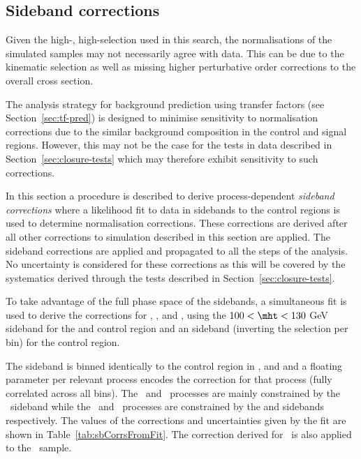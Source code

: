 \subsection{Sideband corrections}
\label{sec:sideband-corrections}

Given the high-\scalht, high-\etmiss selection used in this search, 
the normalisations of the simulated samples may not necessarily agree with data. 
This can be due to the kinematic selection as well as missing higher 
perturbative order corrections to the overall cross section. 

The analysis strategy for background prediction
using transfer factors (see Section~\ref{sec:tf-pred}) is designed to minimise sensitivity 
to normalisation corrections due to the similar background composition
in the control and signal regions. However, this may not be the case for 
the tests in data described in Section~\ref{sec:closure-tests} which
may therefore exhibit sensitivity to such corrections.

In this section a procedure is described to derive process-dependent \emph{sideband corrections}
where a likelihood fit to data in sidebands to the control regions is used to determine
normalisation corrections. These corrections are derived after all other corrections to simulation
described in this section are applied. The sideband corrections are applied and propagated 
to all the steps of the analysis. No uncertainty is considered for these corrections as
this will be covered by the systematics derived through the tests described in Section~\ref{sec:closure-tests}.

To take advantage of the full phase space of the sidebands, a simultaneous 
fit is used to derive the corrections for \gj, \wj, \zj and \ttbar, using the $100<\mht<130$ GeV sideband
for the \mj and \mmj control region and an \alphat sideband (inverting the \alphat selection per \scalht bin)
for the \gj control region. 

The sideband is binned identically to the control region in \njet, \nb and \scalht and a floating 
parameter per relevant process encodes the correction for that process (fully correlated across all bins).
The \wj~and \ttbar~processes are mainly constrained by the \mj~sideband while the \zj~and \gj~processes are
constrained by the \mmj and \gj sidebands respectively. The values of the corrections and uncertainties
given by the fit are shown in Table~\ref{tab:sbCorrsFromFit}. The correction derived for \zj~is
also applied to the \znunu~sample. 

